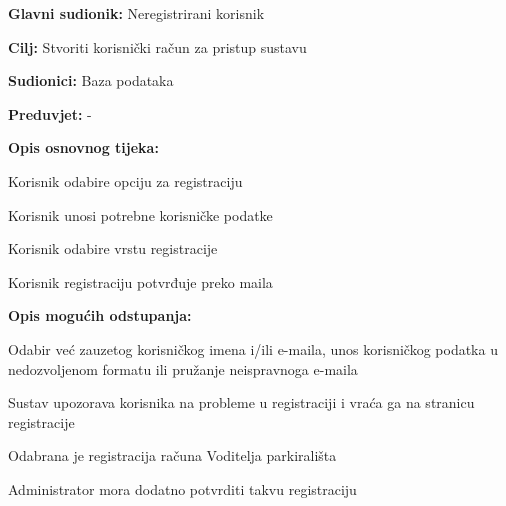 \noindent {}
\begin{packed_item}
	
	\item \textbf{Glavni sudionik: }Neregistrirani korisnik
	\item  \textbf{Cilj:} Stvoriti korisnički račun za pristup sustavu
	\item  \textbf{Sudionici:} Baza podataka
	\item  \textbf{Preduvjet:} -
	\item  \textbf{Opis osnovnog tijeka:}
	
	\item[] \begin{packed_enum} 
		
		\item Korisnik odabire opciju za registraciju
		\item Korisnik unosi potrebne korisničke podatke
		\item Korisnik odabire vrstu registracije
		\item Korisnik registraciju potvrđuje preko maila
		
		
	\end{packed_enum}
	
	\item  \textbf{Opis mogućih odstupanja:}
	
	\item[] \begin{packed_item}
		
		
		\item[2.a] Odabir već zauzetog korisničkog imena i/ili e-maila, unos korisničkog podatka u nedozvoljenom formatu ili pružanje neispravnoga e-maila
		\item[] \begin{packed_enum}
			
			\item Sustav upozorava korisnika na probleme u registraciji i vraća ga na stranicu registracije
		\end{packed_enum}
		\item[3.a] Odabrana je registracija računa Voditelja parkirališta
		\item[] \begin{packed_enum}
			
			\item Administrator mora dodatno potvrditi takvu registraciju
			
			
		\end{packed_enum}
		
		
	\end{packed_item}
\end{packed_item}


